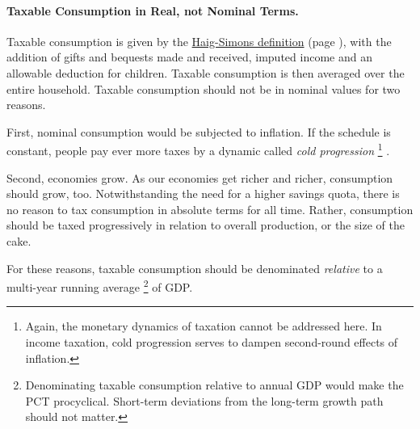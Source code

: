 \paragraph{Taxable Consumption in Real, not Nominal Terms.} Taxable consumption is given by the \hyperref[eq:HaigSimonsPCT]{Haig-Simons definition} (page \pageref{eq:HaigSimonsPCT}), with the addition of gifts and bequests made and received, imputed income and an allowable deduction for children.
Taxable consumption is then averaged over the entire household.
Taxable consumption should not be in nominal values for two reasons.

First, nominal consumption would be subjected to inflation.
If the schedule is constant, people pay ever more taxes by a dynamic called \emph{cold progression}
\footnote{
	Again, the monetary dynamics of taxation cannot be addressed here.
	In income taxation, cold progression serves to dampen second-round effects of inflation.
}
.

Second, economies grow.
As our economies get richer and richer, consumption should grow, too.
Notwithstanding the need for a higher savings quota, there is no reason to tax consumption in absolute terms for all time.
Rather, consumption should be taxed progressively in relation to overall production, or the size of the cake.

For these reasons, taxable consumption should be denominated \emph{relative} to a multi-year running average
\footnote{
	Denominating taxable consumption relative to annual GDP would make the PCT procyclical.
	Short-term deviations from the long-term growth path should not matter.
}
of GDP.

